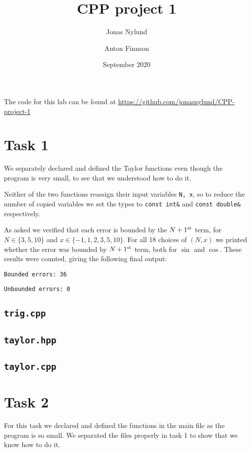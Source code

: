 \documentclass[12pt]{article}
\title{CPP project 1}
\author{Jonas Nylund \and Anton Finnson}
\date{September 2020}
\begin{document}
\maketitle

The code for this lab can be found at \href{https://github.com/jonasnylund/CPP-project-1}{https://github.com/jonasnylund/CPP-project-1}

\section{Task 1}
We separately declared and defined the Taylor functions even though the program is very small, to see that we understood how to do it.

Neither of the two functions reassign their input variables \lstinline{N, x}, so to reduce the number of copied variables we set the types to \lstinline{const int&} and \lstinline{const double&} respectively.

As asked we verified that each error is bounded by the $N+1^{\rm{st}}$ term, for $N \in \{3,5,10\}$ and $x \in \{−1,1,2,3,5,10\}$. For all 18 choices of $(N,x)$ we printed whether the error was bounded by $N+1^{\rm{st}}$ term, both for $\sin$ and $\cos$. These results were counted, giving the following final output:

\lstinline{Bounded errors: 36}

\lstinline{Unbounded errors: 0}


\subsection*{\texttt{trig.cpp}}


\subsection*{\texttt{taylor.hpp}}


\subsection*{\texttt{taylor.cpp}}


\newpage
\section{Task 2}
For this task we declared and defined the functions in the main file as the program is so small. We separated the files properly in task 1 to show that we know how to do it.
\end{document}

